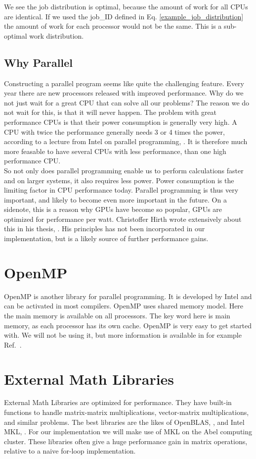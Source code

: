 \documentclass[a4paper,norsk,11pt,twoside]{report}
\begin{document}
We see the job distribution is optimal, because the amount of work for all CPUs are identical. If we used the job\_ID defined in Eq. \eqref{example_job_distribution} the amount of work for each processor would not be the same. This is a sub-optimal work distribution. 

\subsection{Why Parallel}
Constructing a parallel program seems like quite the challenging
feature. Every year there are new processors released with improved
performance. Why do we not just wait for a great CPU that can solve
all our problems? The reason we do not wait for this, is that it will
never happen. The problem with great performance CPUs is that their
power consumption is generally very high. A CPU with twice the
performance generally needs 3 or 4 times the power, according to a
lecture from Intel on parallel programming,
\cite{intelduden_citeation}. It is therefore much more feasable to
have several CPUs with less performance, than one high performance
CPU. \\

So not only does parallel programming enable us to perform
calculations faster and on larger systems, it also requires less
power. Power consumption is the limiting factor in CPU performance
today. Parallel programming is thus very important, and likely to
become even more important in the future. On a sidenote, this is a
reason why GPUs have become so popular, GPUs are optimized for
performance per watt. Christoffer Hirth wrote extensively about this
in his thesis, \cite{non_refer_numba1}. His principles has not been
incorporated in our implementation, but is a likely source of further
performance gains.

\section{OpenMP}
OpenMP is another library for parallel programming. It is developed by
Intel and can be activated in most compilers. OpenMP uses shared memory
model. Here the main memory is available on all processors. The key
word here is main memory, as each processor has its own cache. OpenMP
is very easy to get started with. We will not be using it, but more
information is available in for example Ref.~\cite{openmp_citation_po_g}.

\section{External Math Libraries}
External Math Libraries are optimized for performance. They have
built-in functions to handle matrix-matrix multiplications,
vector-matrix multiplications, and similar problems. The best
libraries are the likes of OpenBLAS, \cite{openblas_citation}, and
Intel MKL, \cite{mkl_citation}. For our implementation we will make
use of MKL on the Abel computing cluster. These libraries often give a
huge performance gain in matrix operations, relative to a naive
for-loop implementation. \\
\end{document}
